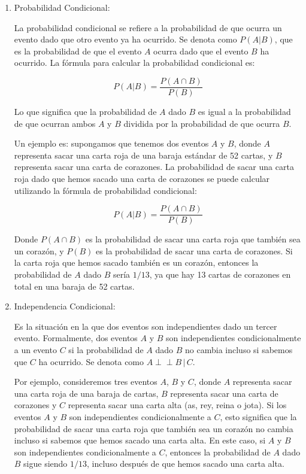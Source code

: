 \begin{enumerate}
    \item Probabilidad Condicional:

La probabilidad condicional se refiere a la probabilidad de que ocurra un evento dado que otro evento ya ha ocurrido. Se denota como \( P(A | B) \), que es la probabilidad de que el evento \( A \) ocurra dado que el evento \( B \) ha ocurrido. La fórmula para calcular la probabilidad condicional es:

\[ P(A | B) = \frac{P(A \cap B)}{P(B)} \]

Lo que significa que la probabilidad de \( A \) dado \( B \) es igual a la probabilidad de que ocurran ambos \( A \) y \( B \) dividida por la probabilidad de que ocurra \( B \).

Un ejemplo es: supongamos que tenemos dos eventos \( A \) y \( B \), donde \( A \) representa sacar una carta roja de una baraja estándar de 52 cartas, y \( B \) representa sacar una carta de corazones. La probabilidad de sacar una carta roja dado que hemos sacado una carta de corazones se puede calcular utilizando la fórmula de probabilidad condicional:

\[ P(A | B) = \frac{P(A \cap B)}{P(B)} \]

Donde \( P(A \cap B) \) es la probabilidad de sacar una carta roja que también sea un corazón, y \( P(B) \) es la probabilidad de sacar una carta de corazones. Si la carta roja que hemos sacado también es un corazón, entonces la probabilidad de \( A \) dado \( B \) sería \( 1/13 \), ya que hay 13 cartas de corazones en total en una baraja de 52 cartas.

\item Independencia Condicional:

Es la situación en la que dos eventos son independientes dado un tercer evento. Formalmente, dos eventos \( A \) y \( B \) son independientes condicionalmente a un evento \( C \) si la probabilidad de \( A \) dado \( B \) no cambia incluso si sabemos que \( C \) ha ocurrido. Se denota como \( A \perp\!\!\!\perp B \,|\, C \).

Por ejemplo, consideremos tres eventos \( A \), \( B \) y \( C \), donde \( A \) representa sacar una carta roja de una baraja de cartas, \( B \) representa sacar una carta de corazones y \( C \) representa sacar una carta alta (as, rey, reina o jota). Si los eventos \( A \) y \( B \) son independientes condicionalmente a \( C \), esto significa que la probabilidad de sacar una carta roja que también sea un corazón no cambia incluso si sabemos que hemos sacado una carta alta. En este caso, si \( A \) y \( B \) son independientes condicionalmente a \( C \), entonces la probabilidad de \( A \) dado \( B \) sigue siendo \( 1/13 \), incluso después de que hemos sacado una carta alta.
\end{enumerate}

